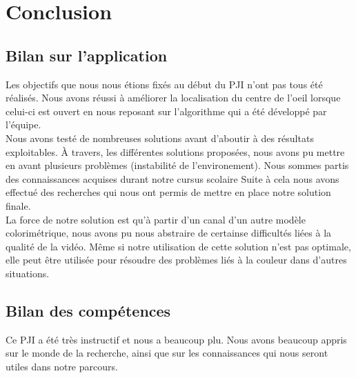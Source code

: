 \section{Conclusion}

\subsection{Bilan sur l'application}
Les objectifs que nous nous étions fixés au début du PJI n'ont pas tous été réalisés. Nous avons réussi à
améliorer la localisation du centre de l'oeil lorsque celui-ci est ouvert en nous reposant sur 
l'algorithme qui a été développé par l'équipe.\\

Nous avons testé de nombreuses solutions avant d'aboutir à des résultats exploitables. À travers, les différentes 
solutions proposées, nous avons pu mettre en avant plusieurs problèmes (instabilité de l'environement).
Nous sommes partis des connaissances acquises durant notre cursus scolaire 
Suite à cela nous avons effectué des recherches qui nous ont permis de mettre en place 
notre solution finale.\\


La force de notre solution est qu'à partir d'un canal d'un autre modèle colorimétrique, nous avons pu 
nous abstraire de certainse difficultés liées à la qualité de la vidéo. Même si notre utilisation de cette
solution n'est pas optimale, elle peut être utilisée pour résoudre des problèmes liés à la couleur dans d'autres situations.\\

\subsection{Bilan des compétences}
Ce PJI a été très instructif et nous a beaucoup plu. Nous avons beaucoup appris sur le monde 
de la recherche, ainsi que sur les connaissances qui nous seront utiles dans notre parcours.\\

